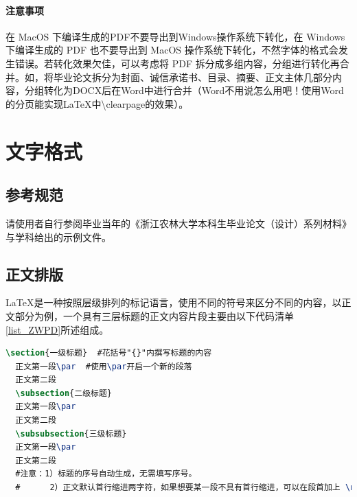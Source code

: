 \documentclass[AutoFakeBold]{ZafuThesis}
\begin{document}
\paragraph{注意事项}
在 MacOS 下编译生成的PDF不要导出到Windows操作系统下转化，在 Windows 下编译生成的 PDF 也不要导出到 MacOS 操作系统下转化，不然字体的格式会发生错误。若转化效果欠佳，可以考虑将 PDF 拆分成多组内容，分组进行转化再合并。如，将毕业论文拆分为封面、诚信承诺书、目录、摘要、正文主体几部分内容，分组转化为DOCX后在Word中进行合并（Word不用说怎么用吧！使用Word的分页能实现\LaTeX 中\textbackslash clearpage的效果）。



\section{文字格式}
\subsection{参考规范}
请使用者自行参阅毕业当年的《浙江农林大学本科生毕业论文（设计）系列材料》与学科给出的示例文件。
\subsection{正文排版}
\LaTeX 是一种按照层级排列的标记语言，使用不同的符号来区分不同的内容，以正文部分为例，一个具有三层标题的正文内容片段主要由以下代码清单 \ref{list_ZWPD}所述组成。

\begin{lstlisting}[caption=正文片段, label = list_ZWPD,language = tex]
  \section{一级标题}  #花括号"{}"内撰写标题的内容
  正文第一段\par  #使用\par开启一个新的段落
  正文第二段
  \subsection{二级标题}
  正文第一段\par
  正文第二段
  \subsubsection{三级标题}
  正文第一段\par
  正文第二段
  #注意：1）标题的序号自动生成，无需填写序号。
  #      2）正文默认首行缩进两字符，如果想要某一段不具有首行缩进，可以在段首加上 \noindent
\end{lstlisting}
\par
\end{document}
